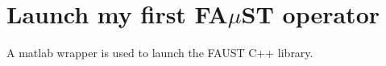 \section{Launch my first FA$\mu$ST operator}\label{sec:firstUse}

A matlab wrapper is used to launch the FAUST C++ library. 

